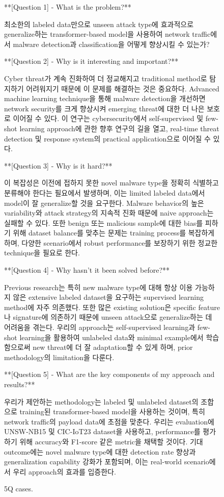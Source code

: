 \begin{figure}[htbp]
\centering
\begin{tcolorbox}[colback=green!2!white, colframe=gray!50!green]
\begin{minipage}{\linewidth}
\small
**[Question 1] - What is the problem?**

최소한의 labeled data만으로 unseen attack type에 효과적으로 generalize하는 transformer-based model을 사용하여 network traffic에서 malware detection과 classification을 어떻게 향상시킬 수 있는가?

**[Question 2] - Why is it interesting and important?**

Cyber threat가 계속 진화하여 더 정교해지고 traditional method로 탐지하기 어려워지기 때문에 이 문제를 해결하는 것은 중요하다. Advanced machine learning technique을 통해 malware detection을 개선하면 network security를 크게 향상시켜 emerging threat에 대한 더 나은 보호로 이어질 수 있다. 이 연구는 cybersecurity에서 self-supervised 및 few-shot learning approach에 관한 향후 연구의 길을 열고, real-time threat detection 및 response system의 practical application으로 이어질 수 있다.

**[Question 3] - Why is it hard?**

이 복잡성은 이전에 접하지 못한 novel malware type을 정확히 식별하고 분류해야 한다는 필요에서 발생하며, 이는 limited labeled data에서 model이 잘 generalize할 것을 요구한다. Malware behavior의 높은 variability와 attack strategy의 지속적 진화 때문에 naive approach는 실패할 수 있다. 또한 benign 또는 malicious sample에 대한 bias를 피하기 위해 dataset balance를 맞추는 문제는 training process를 복잡하게 하며, 다양한 scenario에서 robust performance를 보장하기 위한 정교한 technique을 필요로 한다.

**[Question 4] - Why hasn't it been solved before?**

Previous research는 특히 new malware type에 대해 항상 이용 가능하지 않은 extensive labeled dataset을 요구하는 supervised learning method에 자주 의존했다. 또한 많은 existing solution은 specific feature나 signature에 의존하기 때문에 unseen attack으로 generalize하는 데 어려움을 겪는다. 우리의 approach는 self-supervised learning과 few-shot learning을 활용하여 unlabeled data와 minimal example에서 학습함으로써 new threat에 더 잘 adaptation할 수 있게 하며, prior methodology의 limitation을 다룬다.

**[Question 5] - What are the key components of my approach and results?**

우리가 제안하는 methodology는 labeled 및 unlabeled dataset의 조합으로 training된 transformer-based model을 사용하는 것이며, 특히 network traffic의 payload data에 초점을 맞춘다. 우리는 evaluation에 UNSW-NB15 및 CIC-IoT23 dataset을 사용하고, performance를 평가하기 위해 accuracy와 F1-score 같은 metric을 채택할 것이다. 기대 outcome에는 novel malware type에 대한 detection rate 향상과 generalization capability 강화가 포함되며, 이는 real-world scenario에서 우리 approach의 효과를 입증한다.
\end{minipage}
\end{tcolorbox}
\caption{5Q cases.}
\label{fig:generated-research-idea-case}
\end{figure}

